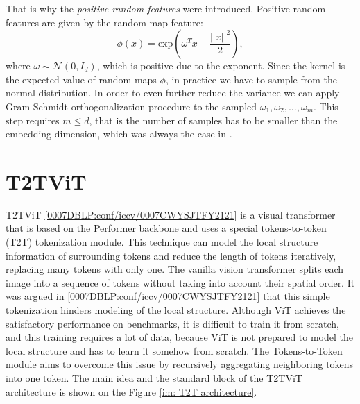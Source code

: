 \documentclass[magisterska,en]{pracamgr}
\begin{document}
That is why the \textit{positive random features} were introduced. Positive random features are given by the random map feature:
\begin{equation*}
    \phi(x) = \textrm{exp}\left(\omega^T x-\frac{||x||^2}{2}\right),
\end{equation*}
where $\omega \sim \mathcal{N}(0, I_d)$, which is positive due to the exponent. Since the kernel is the expected value of random maps $\phi$, in practice we have to sample from the normal distribution. In order to even further reduce the variance we can apply Gram-Schmidt orthogonalization procedure to the sampled $\omega_1, \omega_2, \ldots, \omega_m$. This step requires $m\leq d$, that is the number of samples has to be smaller than the embedding dimension, which was always the case in \cite{DBLP:conf/iclr/ChoromanskiLDSG21}.

\section{T2T\textunderscore ViT}\label{s:T2T}

T2T\textunderscore ViT \ref{0007DBLP:conf/iccv/0007CWYSJTFY2121} is a visual transformer that is based on the Performer backbone and uses a special tokens-to-token (T2T) tokenization module. This technique can model the local structure information of surrounding tokens and reduce the length of tokens iteratively, replacing many tokens with only one. The vanilla vision transformer splits each image into a sequence of tokens without taking into account their spatial order. It was argued in \ref{0007DBLP:conf/iccv/0007CWYSJTFY2121} that this simple tokenization hinders modeling of the local structure. Although ViT achieves the satisfactory performance on benchmarks, it is difficult to train it from scratch, and this training requires a lot of data, because ViT is not prepared to model the local structure and has to learn it somehow from scratch. The Tokens-to-Token module aims to overcome this issue by recursively aggregating neighboring tokens into one token. The main idea and the standard block of the T2T\textunderscore ViT architecture is shown on the Figure \ref{im: T2T architecture}.
\end{document}
